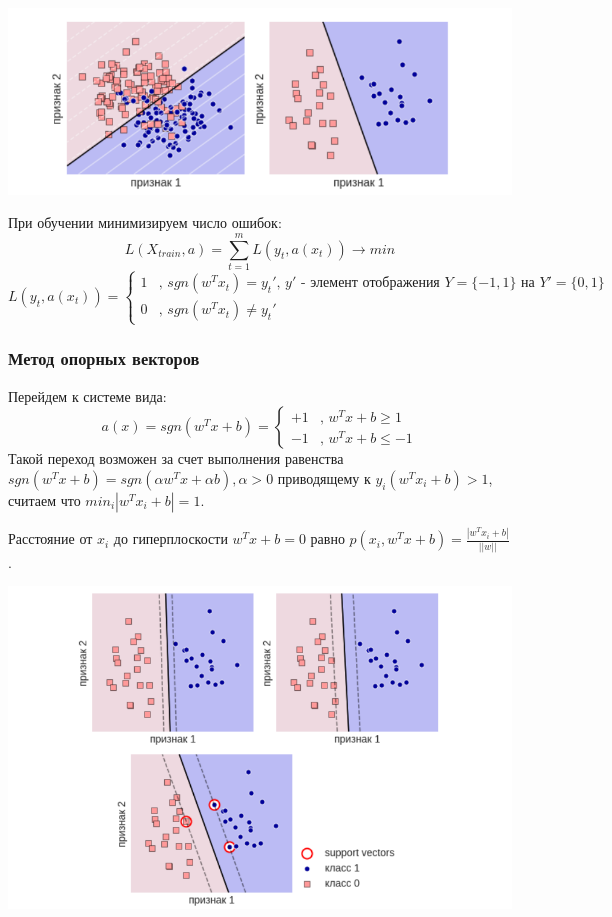 \includegraphics[scale=0.4]{pics/ml2_lin3.png}

При обучении минимизируем число ошибок:
\begin{equation}
L(X_{train}, a) = \sum\limits_{t=1}^m L(y_t, a(x_t)) \rightarrow min
\end{equation}
\begin{equation*}
L(y_t, a(x_t)) = 
 \begin{cases}
   1 &\text{, $sgn(w^Tx_t) = y_t'$, $y'$ - элемент отображения $Y = \{-1, 1\}$ на $Y' = \{0, 1\}$}\\
   0 &\text{, $sgn(w^Tx_t) \ne y_t'$}
 \end{cases}
\end{equation*}

\subsubsection{Метод опорных векторов}
Перейдем к системе вида:
\begin{equation*}
a(x) = sgn(w^Tx + b) =  
 \begin{cases}
   +1 &\text{, $w^Tx + b \geq 1$}\\
   -1 &\text{, $w^Tx + b \leq -1$}
 \end{cases}
\end{equation*}
Такой переход возможен за счет выполнения равенства $sgn(w^Tx + b) = sgn(\alpha w^Tx + \alpha b), \alpha > 0$ приводящему к $y_i(w^Tx_i + b) > 1$, считаем что $min_i|w^Tx_i + b| = 1$.

Расстояние от $x_i$ до гиперплоскости $w^Tx + b = 0$ равно $p(x_i, w^Tx + b) = \frac{|w^Tx_i + b|}{||w||}$.

\includegraphics[scale=0.4]{pics/ml2_lin4.png}

